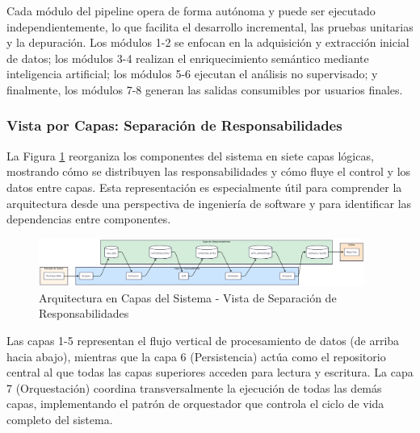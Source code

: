 Cada módulo del pipeline opera de forma autónoma y puede ser ejecutado independientemente, lo que facilita el desarrollo incremental, las pruebas unitarias y la depuración. Los módulos 1-2 se enfocan en la adquisición y extracción inicial de datos; los módulos 3-4 realizan el enriquecimiento semántico mediante inteligencia artificial; los módulos 5-6 ejecutan el análisis no supervisado; y finalmente, los módulos 7-8 generan las salidas consumibles por usuarios finales.

\subsubsection{Vista por Capas: Separación de Responsabilidades}

La Figura \ref{fig:arquitectura-capas} reorganiza los componentes del sistema en siete capas lógicas, mostrando cómo se distribuyen las responsabilidades y cómo fluye el control y los datos entre capas. Esta representación es especialmente útil para comprender la arquitectura desde una perspectiva de ingeniería de software y para identificar las dependencias entre componentes.

\begin{figure}[H]
\centering
\includegraphics[width=0.95\textwidth]{diagrams/ArquitecturaHorizontal.png}
\caption{Arquitectura en Capas del Sistema - Vista de Separación de Responsabilidades}
\label{fig:arquitectura-capas}
\end{figure}

Las capas 1-5 representan el flujo vertical de procesamiento de datos (de arriba hacia abajo), mientras que la capa 6 (Persistencia) actúa como el repositorio central al que todas las capas superiores acceden para lectura y escritura. La capa 7 (Orquestación) coordina transversalmente la ejecución de todas las demás capas, implementando el patrón de orquestador que controla el ciclo de vida completo del sistema.

